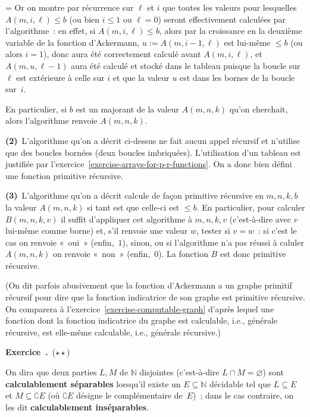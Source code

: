 \documentclass[12pt,a4paper]{article}
\theoremstyle{definition}
\newcommand\exercice{%
\refstepcounter{comcnt}\bigskip\noindent\textbf{Exercice~\thecomcnt.}}
\newif\ifcorrige
\newenvironment{corrige}%
{\ifcorrige\relax\else\setbox0=\vbox\bgroup\fi%
\smallbreak\footnotesize\noindent{\underbar{\textit{Corrigé.}}\quad}}
{{\hbox{}\nobreak\hfill\checkmark}%
\ifcorrige\relax\else\egroup\fi\par}
\begin{document}
\begin{corrige}
Or on montre par récurrence sur $\ell$ et $i$ que toutes les valeurs
pour lesquelles $A(m,i,\ell) \leq b$ (ou bien $i\leq 1$ ou $\ell=0$)
seront effectivement calculées par l'algorithme : en effet, si
$A(m,i,\ell) \leq b$, alors par la croissance en la deuxième variable
de la fonction d'Ackermann, $u := A(m,i-1,\ell)$ est lui-même $\leq b$
(ou alors $i=1$), donc aura été correctement calculé avant
$A(m,i,\ell)$, et $A(m,u,\ell-1)$ aura été calculé et stocké dans le
tableau puisque la boucle sur $\ell$ est extérieure à celle sur $i$ et
que la valeur $u$ est dans les bornes de la boucle sur $i$.

En particulier, si $b$ est un majorant de la valeur $A(m,n,k)$ qu'on
cherchait, alors l'algorithme renvoie $A(m,n,k)$.

\textbf{(2)} L'algorithme qu'on a décrit ci-dessus ne fait aucun appel
récursif et n'utilise que des boucles bornées (deux boucles
imbriquées).  L'utilisation d'un tableau est justifiée par
l'exercice \ref{exercise-arrays-for-p-r-functions}.  On a donc bien
défini une fonction primitive récursive.

\textbf{(3)} L'algorithme qu'on a décrit calcule de façon primitive
récursive en $m,n,k,b$ la valeur $A(m,n,k)$ si tant est que celle-ci
est $\leq b$.  En particulier, pour calculer $B(m,n,k,v)$ il suffit
d'appliquer cet algorithme à $m,n,k,v$ (c'est-à-dire avec $v$ lui-même
comme borne) et, s'il renvoie une valeur $w$, tester si $v=w$ : si
c'est le cas on renvoie « oui » (enfin, $1$), sinon, ou si
l'algorithme n'a pas réussi à caluler $A(m,n,k)$ on renvoie « non »
(enfin, $0$).  La fonction $B$ est donc primitive récursive.

(On dit parfois abusivement que la fonction d'Ackermann a un graphe
primitif récursif pour dire que la fonction indicatrice de son graphe
est primitive récursive.  On comparera à
l'exercice \ref{exercise-computable-graph} d'après lequel une
fonction dont la fonction indicatrice du graphe est calculable, i.e.,
générale récursive, est elle-même calculable, i.e., générale
récursive.)
\end{corrige}

%

\exercice\label{exercise-computably-inseparable-sets}\ (${\star}{\star}$)\par\nobreak

On dira que deux parties $L,M$ de $\mathbb{N}$ disjointes
(c'est-à-dire $L\cap M = \varnothing$) sont \textbf{calculablement
  séparables} lorsqu'il existe un $E \subseteq \mathbb{N}$ décidable
tel que $L \subseteq E$ et $M \subseteq \complement E$ (où
$\complement E$ désigne le complémentaire de $E$) ; dans le cas
contraire, on les dit \textbf{calculablement inséparables}.
\end{document}
